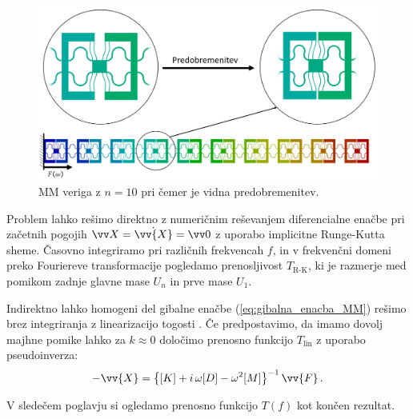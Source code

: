         \begin{figure}[!hb]
            \centering
            \includegraphics[trim={0.0cm 0.0cm 0.0cm 0.0cm}, clip, width=1.0\textwidth]{Magisterski praktikum/slike/metodologija/ROC_MKE_veriga.png}
            \caption{MM veriga z $n=10$ pri čemer je vidna predobremenitev.}\label{fig:MM_veriga_MKE}
        \end{figure}

        Problem lahko rešimo direktno z numeričnim reševanjem diferencialne enačbe pri začetnih pogojih $\vv X = \dot{\vv{X}}=\vv 0$ z uporabo implicitne Runge-Kutta sheme. Časovno integriramo pri različnih frekvencah $f$, in v frekvenčni domeni preko Fouriereve transformacije pogledamo prenosljivost $T_{\text{R-K}}$, ki je razmerje med pomikom zadnje glavne mase $U_n$ in prve mase $U_1$. 

        Indirektno lahko homogeni del gibalne enačbe (\ref{eq:gibalna_enacba_MM}) rešimo brez integriranja z linearizacijo togosti \cite{rao2017mechanical}. Če predpostavimo, da imamo dovolj majhne pomike lahko za $k\approx 0$ določimo prenosno funkcijo $T_{\text{lin}}$ z uporabo pseudoinverza:
        \begin{align}
            -\vv{X}= \left\{ [K]+ i \, \omega [D]-\omega^2 [M] \right\}^{-1} \vv{F}\,.
        \end{align}

        V sledečem poglavju si ogledamo prenosno funkcijo $T(f)$ kot končen rezultat. 

